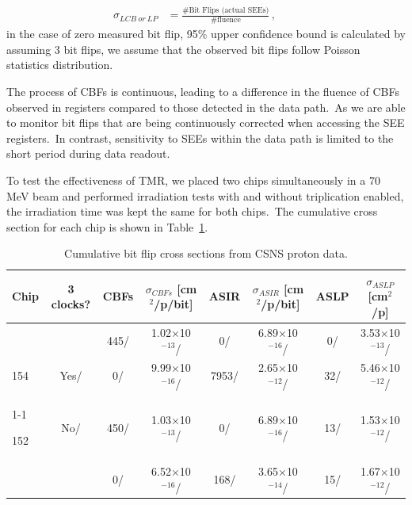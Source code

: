 \documentclass[a4paper,11pt]{article}
\begin{document}
\begin{equation}
\label{eq:x1}
\begin{aligned}
\sigma_{LCB\ or\ LP} &= \frac{\#\text{Bit Flips (actual SEEs)}}{\#\text{fluence}} \,,
\qquad
\end{aligned}
\end{equation}
in the case of zero measured bit flip, 95\% upper confidence bound is calculated by assuming 3 bit flips, we assume that the observed bit flips follow Poisson statistics distribution.

The process of CBFs is continuous, leading to a difference in the fluence of CBFs observed in registers compared to those detected in the data path.\ As we are able to monitor bit flips that are being continuously corrected when accessing the SEE registers.\ In contrast, sensitivity to SEEs within the data path is limited to the short period during data readout.

To test the effectiveness of TMR, we placed two chips simultaneously in a 70 MeV beam and performed irradiation tests with and without triplication enabled, the irradiation time was kept the same for both chips.\ The cumulative cross section for each chip is shown in Table~\ref{tab:t1}.

\begin{table}[htbp]
\centering
\caption{Cumulative bit flip cross sections from CSNS proton data.\label{tab:t1}}
\smallskip
\small{
\setlength{\tabcolsep}{2mm}
\begin{tabular}{l|c|c|c|c|c|c|c}
\hline

Chip & 3 clocks? & CBFs &  $\sigma_{CBFs}$ [cm$^{2}$/p/bit] & ASIR & $\sigma_{ASIR}$ [cm$^{2}$/p/bit] & ASLP & $\sigma_{ASLP}$ [cm$^{2}$/p] \\
\hline
    &      & 445/ & 1.02$\times$10$^{-13}$/  &    0/ & 6.89$\times$10$^{-16}$/ &  0/ & 3.53$\times$10$^{-13}$/\\
154 & Yes/ &  0/  & 9.99$\times$10$^{-16}$/  & 7953/ &      
    2.65$\times$10$^{-12}$/ & 32/ & 5.46$\times$10$^{-12}$/    \\

\cline{1-1}
\cline{3-8}

152 & No/ & 450/ & 1.03$\times$10$^{-13}$/ &   0/ & 6.89$\times$10$^{-16}$/      & 13/ & 1.53$\times$10$^{-12}$/\\
    &     &  0/  & 6.52$\times$10$^{-16}$/ & 168/ & 3.65$\times$10$^{-14}$/
    & 15/ & 1.67$\times$10$^{-12}$/\\


\hline
\end{tabular}}
\end{table}
\end{document}
